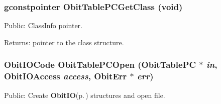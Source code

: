 \subsubsection{\setlength{\rightskip}{0pt plus 5cm}gconstpointer Obit\-Table\-PCGet\-Class (void)}\label{ObitTablePC_8h_a13}


Public: Class\-Info pointer. 

\begin{Desc}
\item[Returns:]pointer to the class structure. \end{Desc}
\subsubsection{\setlength{\rightskip}{0pt plus 5cm}Obit\-IOCode Obit\-Table\-PCOpen ({\bf Obit\-Table\-PC} $\ast$ {\em in}, Obit\-IOAccess {\em access}, {\bf Obit\-Err} $\ast$ {\em err})}\label{ObitTablePC_8h_a17}


Public: Create {\bf Obit\-IO}{\rm (p.\,\pageref{structObitIO})} structures and open file. 

